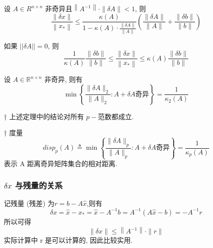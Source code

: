 \documentclass[12pt,a4paper]{article}
\begin{document}
\begin{framed}
	\begin{theorem}
		设 $A ∈ R^{n×n}$ 非奇异且$\left\|A^{-1}\right\| \cdot\|\delta A\|<1$, 则
		\begin{equation}
		\frac{\|\delta x\|}{\left\|x_{*}\right\|} \leq \frac{\kappa(A)}{1-\kappa(A) \cdot \frac{\|\delta A\|}{\|A\|}}\left(\frac{\|\delta A\|}{\|A\|}+\frac{\|\delta b\|}{\|b\|}\right)
		\end{equation}
		
		如果 $||\delta A||=0$, 则
		\begin{equation}
		\frac{1}{\kappa(A)} \frac{\|\delta b\|}{\|b\|} \leq \frac{\|\delta x\|}{\left\|x_{*}\right\|} \leq \kappa(A) \frac{\|\delta b\|}{\|b\|}
		\end{equation}
	\end{theorem}
\end{framed}

\begin{framed}
	\begin{theorem}
		设 $A ∈ \mathbb{R}^{n×n}$ 非奇异, 则有
		\begin{equation}
		\min \left\{\frac{\|\delta A\|_{2}}{\|A\|_{2}} : A+\delta A \text{奇异}\right\}=\frac{1}{\kappa_{2}(A)}
		\end{equation}
	\end{theorem}
\end{framed}

\begin{framed}
	† 上述定理中的结论对所有 $p-$范数都成立.
\end{framed}

\begin{framed}
	† 度量
	\begin{equation}
	disp_p(A) \triangleq \min \left\{\frac{\|\delta A\|_{p}}{\|A\|_{p}} : A+\delta A \text{奇异}\right\}=\frac{1}{\kappa_{p}(A)}
	\end{equation}	
	表示 A 距离奇异矩阵集合的相对距离.
\end{framed}

\subsubsection{$δx$ 与残量的关系}
记残量 (残差) 为$r=b-A \hat{x}$,则有
\begin{equation}
\delta x=\hat{x}-x_{*}=\hat{x}-A^{-1} b=A^{-1}(A \hat{x}-b)=-A^{-1} r
\end{equation}
所以可得
\begin{equation}
\|\delta x\| \leq\left\|A^{-1}\right\| \cdot\|r\|
\end{equation}
实际计算中 r 是可以计算的, 因此比较实用.
\end{document}
